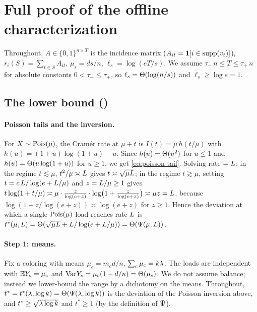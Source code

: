 \section{Full proof of the offline characterization}\label{app:offline}

Throughout, $A\in\{0,1\}^{n\times T}$ is the incidence matrix ($A_{it}=\mathbf{1}[i\in\mathrm{supp}(v_t)]$), $r_i(S)=\sum_{t\in S}A_{it}$,
$\mu_s=ds/n$, $\ell_s=\log(eT/s)$. We assume $\tau_-\,n\le T\le\tau_+\,n$ for absolute constants $0<\tau_-\le\tau_+$, so
$\ell_s=\Theta(\log(n/s))$ and $\ell_s\ge\log e=1$.

\subsection{The lower bound ()}\label{app:offline-lower-full}

\paragraph{Poisson tails and the inversion.}
For $X\sim\mathrm{Pois}(\mu)$, the Cram\'er rate at $\mu+t$ is $I(t)=\mu\,h(t/\mu)$ with $h(u)=(1+u)\log(1+u)-u$. Since
$h(u)=\Theta(u^2)$ for $u\le 1$ and $h(u)=\Theta(u\log(1+u))$ for $u\ge 1$, we get \eqref{eq:poisson-tail}. Solving rate $=L$:
in the regime $t\lesssim\mu$, $t^2/\mu\asymp L$ gives $t\asymp\sqrt{\mu L}$; in the regime $t\gtrsim\mu$, setting
$t=c\,L/\log(e+L/\mu)$ and $z=L/\mu\ge 1$ gives $t\log(1+t/\mu)\asymp \mu\cdot\frac{z}{\log(e+z)}\cdot\log\!\big(1+\tfrac{z}{\log(e+z)}\big)\asymp\mu z=L$, because $\log(1+z/\log(e+z))\asymp\log(e+z)$ for $z\ge 1$. Hence the deviation at which a single $\mathrm{Pois}(\mu)$ load reaches rate $L$ is $t^*(\mu,L)=\Theta(\sqrt{\mu L}+L/\log(e+L/\mu))=\Theta(\Psi(\mu,L))$.

\paragraph{Step 1: means.}
Fix a coloring with means $\mu_c=m_c d/n$, $\sum_c\mu_c=k\lambda$. The loads are independent with $\mathbb{E} Y_c=\mu_c$ and
$\mathrm{Var} Y_c=\mu_c(1-d/n)=\Theta(\mu_c)$. We do not assume balance; instead we lower-bound the range by a dichotomy on the means.
Throughout, $t^*=t^*(\lambda,\log k)=\Theta(\Psi(\lambda,\log k))$ is the deviation of the Poisson inversion above, and
$t^*\ge\sqrt{\lambda\log k}$ and $t^*\ge1$ (by the definition of $\Psi$).

